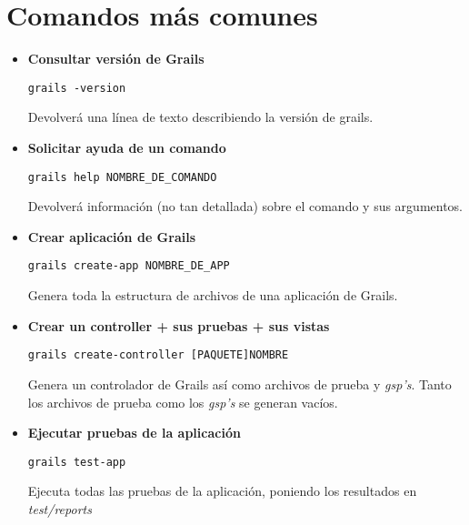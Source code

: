 \chapter{Comandos m\'as comunes}

\begin{itemize}

    \item \textbf{Consultar versi\'on de Grails}    
        \begin{lstlisting}[gobble=11] 
            grails -version
        \end{lstlisting}
        Devolver\'a una l\'inea de texto describiendo la versi\'on de grails.

    \item \textbf{Solicitar ayuda de un comando}
        \begin{lstlisting}[gobble=11]
            grails help NOMBRE_DE_COMANDO
        \end{lstlisting}
        Devolver\'a informaci\'on (no tan detallada) sobre el comando y sus argumentos.

    \item \textbf{Crear aplicaci\'on de Grails}
        \begin{lstlisting}[gobble=11]
            grails create-app NOMBRE_DE_APP
        \end{lstlisting}
        Genera toda la estructura de archivos de una aplicaci\'on de Grails.

    \item \textbf{Crear un controller + sus pruebas + sus vistas}
        \begin{lstlisting}[gobble=11]
            grails create-controller [PAQUETE]NOMBRE
        \end{lstlisting}
        Genera un controlador de Grails as\'i como archivos de prueba y \textit{gsp's}. Tanto los archivos de prueba como los \textit{gsp's} se generan vac\'ios.

    \item \textbf{Ejecutar pruebas de la aplicaci\'on}
        \begin{lstlisting}[gobble=11]
            grails test-app
        \end{lstlisting}
        Ejecuta todas las pruebas de la aplicaci\'on, poniendo los resultados en \textit{test/reports}


\end{itemize}
